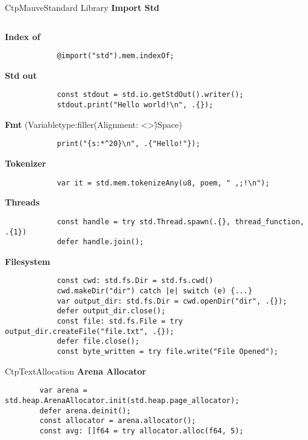 \documentclass[10pt,a4paper]{article}
\begin{document}
\begin{multicols*}{3}
\begin{mycolorbox}{CtpMauve}{Standard Library}
		\textbf{Import Std}
		\begin{verbatim}
		\end{verbatim}
	
		\textbf{Index of}
		\begin{verbatim}
			@import("std").mem.indexOf;
		\end{verbatim}
	
		\textbf{Std out}
		\begin{verbatim}
			const stdout = std.io.getStdOut().writer();
			stdout.print("Hello world!\n", .{});
		\end{verbatim}
	
			\textbf{Fmt} (Variabletype:filler(Alignment: <>\^)Space)
		\begin{verbatim}
			print("{s:*^20}\n", .{"Hello!"});
		\end{verbatim}
		\textbf{Tokenizer}
		\begin{verbatim}
			var it = std.mem.tokenizeAny(u8, poem, " ,;!\n");
		\end{verbatim}
	
		\textbf{Threads}
		\begin{verbatim}
			const handle = try std.Thread.spawn(.{}, thread_function, .{1})
			defer handle.join();
		\end{verbatim}
	
		\textbf{Filesystem}
		\begin{verbatim}
			const cwd: std.fs.Dir = std.fs.cwd()
			cwd.makeDir("dir") catch |e| switch (e) {...}
			var output_dir: std.fs.Dir = cwd.openDir("dir", .{});
			defer output_dir.close();
			const file: std.fs.File = try output_dir.createFile("file.txt", .{});
			defer file.close();
			const byte_written = try file.write("File Opened");
		\end{verbatim}
\end{mycolorbox}


\begin{mycolorbox}{CtpText}{Allocation}
		\textbf{Arena Allocator}
	\begin{verbatim}
		var arena = std.heap.ArenaAllocator.init(std.heap.page_allocator);
		defer arena.deinit();
		const allocator = arena.allocator();
		const avg: []f64 = try allocator.alloc(f64, 5);
	\end{verbatim}


\end{mycolorbox}
\end{multicols*}
\end{document}

